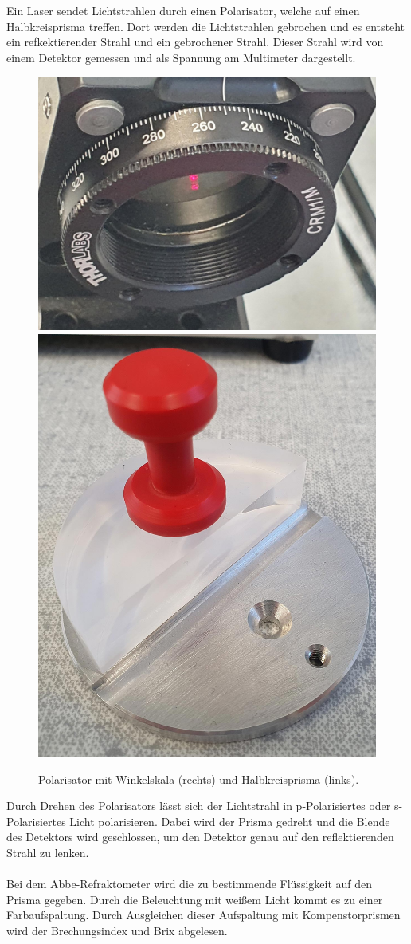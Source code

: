 \documentclass[12pt,a4paper,twoside]{article}
\begin{document}
\noindent
Ein Laser sendet Lichtstrahlen durch einen Polarisator, welche auf einen Halbkreisprisma treffen. Dort werden die Lichtstrahlen gebrochen und es entsteht ein refkektierender Strahl und ein gebrochener Strahl. 
Dieser Strahl wird von einem Detektor gemessen und als Spannung am Multimeter dargestellt. 

\begin{figure}[H]
    \centering
    \includegraphics[width=0.4\linewidth]{nudes/Polarisator.jpg}
    \includegraphics[width=0.4\linewidth]{nudes/halbkreisprisma.jpg}
    \caption{Polarisator mit Winkelskala (rechts) und Halbkreisprisma (links). }
    \label{fig:Polarisator und prisma}
\end{figure}

\noindent
Durch Drehen des Polarisators lässt sich der Lichtstrahl in p-Polarisiertes oder s-Polarisiertes Licht polarisieren. 
Dabei wird der Prisma gedreht und die Blende des Detektors wird geschlossen, um den Detektor genau auf den reflektierenden Strahl zu lenken. 
\\
\\
Bei dem Abbe-Refraktometer wird die zu bestimmende Flüssigkeit auf den Prisma gegeben. Durch die Beleuchtung mit weißem Licht kommt es zu einer Farbaufspaltung. 
Durch Ausgleichen dieser Aufspaltung mit Kompenstorprismen wird der Brechungsindex und Brix abgelesen. 
\end{document}
